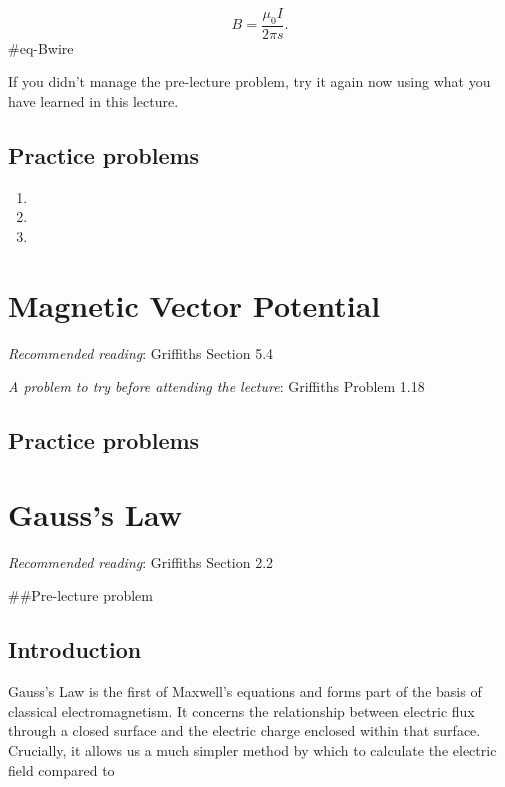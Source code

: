 \documentclass[
  letterpaper,
  DIV=11,
  numbers=noendperiod]{scrreprt}
\providecommand{\tightlist}{%
  \setlength{\itemsep}{0pt}\setlength{\parskip}{0pt}}\usepackage{longtable,booktabs,array}
\begin{document}
\[ B = \frac{\mu_0 I}{2\pi s}. \]\#eq-Bwire

If you didn't manage the pre-lecture problem, try it again now using
what you have learned in this lecture.

\section{Practice problems}\label{practice-problems-4}

\begin{enumerate}
\def\labelenumi{\arabic{enumi})}
\tightlist
\item
\item
\item
\end{enumerate}


\chapter{Magnetic Vector Potential}\label{magnetic-vector-potential}

\emph{Recommended reading}: Griffiths Section 5.4

\emph{A problem to try before attending the lecture}: Griffiths Problem
1.18

\section{Practice problems}\label{practice-problems-5}


\chapter{Gauss's Law}\label{gausss-law}

\emph{Recommended reading}: Griffiths Section 2.2

\#\#Pre-lecture problem

\section{Introduction}\label{introduction}

Gauss's Law is the first of Maxwell's equations and forms part of the
basis of classical electromagnetism. It concerns the relationship
between electric flux through a closed surface and the electric charge
enclosed within that surface. Crucially, it allows us a much simpler
method by which to calculate the electric field compared to
\end{document}
